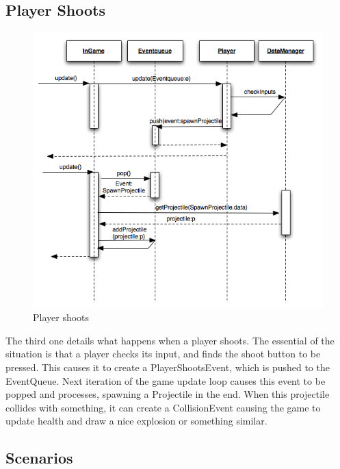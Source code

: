 \subsection{Player Shoots}
\begin{figure}[H]
	\begin{center}
		\includegraphics[scale=0.75]{graphics/PlayerShoots}
	\end{center}
        \caption{Player shoots}
\end{figure}

The third one details what happens when a player shoots. The essential of the
situation is that a player checks its input, and finds the shoot button to be
pressed. This causes it to create a PlayerShootsEvent, which is pushed to the
EventQueue. Next iteration of the game update loop causes this event to be
popped and processes, spawning a Projectile in the end. When this projectile
collides with something, it can create a CollisionEvent causing the game
to update health and draw a nice explosion or something similar.

\subsection{Scenarios}

